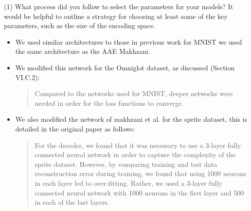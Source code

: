 \documentclass{article}
\begin{document}
{\color{blue}
(1) What process did you follow to select the parameters for your models? It would be helpful to outline a strategy for choosing at least some of the key parameters, such as the size of the encoding space. }\newline
\begin{itemize}
    \item We used similar architectures to those in previous work for MNIST we used the same architecture as the AAE {Makhzani}.
    \item We modified this network for the Omniglot dataset, as discussed (Section VI.C.2):
    \begin{quote}
        Compared  to  the  networks  used  for  MNIST,  deeper networks  were  needed  in  order  for  the  loss  functions  to converge.
    \end{quote}
    \item We also modified the network of makhzani et al. for the sprite dataset, this is detailed in the original paper as follows:
    \begin{quote}
        For  the  decoder,  we  found  that  it  was  necessary  to  use  a 3-layer  fully  connected  neural  network  in  order  to  capture the  complexity  of  the  sprite  dataset.  However,  by  comparing training and test data reconstruction error during training, we found that using 1000 neurons in each layer led to over-fitting. Rather, we used a 3-layer fully connected neural network with 1000 neurons  in  the  first  layer  and 500 in  each  of  the  last layers.
    \end{quote}
    
\end{itemize}
\end{document}

